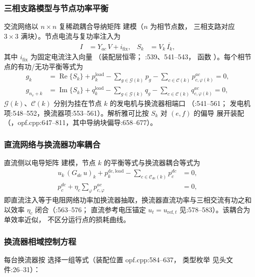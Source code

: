 \subsubsection*{三相支路模型与节点功率平衡}
交流网络以 $n\times n$ 复稀疏耦合导纳矩阵  建模（$n$ 为相节点数，
三相支路对应 $3\times 3$ 满块）。节点电流与复功率注入为
\begin{align*}
I &= Y_{ac}\,V + i_{\mathrm{fix}}, &
S_k &= V_k\,\overline{I_k},
\end{align*}
其中 $i_{\mathrm{fix}}$ 为固定电流注入向量 （装配层恒零；
:539、541--543，
函数 ）。每个相节点的有功/无功平衡等式为
\begin{align*}
g_k &= \operatorname{Re}\{S_k\} + p^{\mathrm{load}}_k
  - \sum_{g\in\mathcal{G}(k)} p_{g} - \sum_{c\in\mathcal{C}(k)} p^{ac}_{c,\varphi(k)} = 0,\\
g_{n_v+k} &= \operatorname{Im}\{S_k\} + q^{\mathrm{load}}_k
  - \sum_{g\in\mathcal{G}(k)} q_{g} - \sum_{c\in\mathcal{C}(k)} q^{ac}_{c,\varphi(k)} = 0,
\end{align*}
$\mathcal{G}(k)$、$\mathcal{C}(k)$ 分别为挂在节点 $k$ 的发电机与换流器相端口
（:541--561；
发电机项:548--552，换流器项:553--561）。解析雅可比按 $S_k$ 对 $(e,f)$ 的偏导
展开装配（，opf.cpp:647--811，其中导纳块偏导:658--677）。

\subsubsection*{直流网络与换流器功率耦合}
直流侧以电导矩阵  建模，节点 $k$ 的平衡等式与换流器耦合等式为
\begin{align*}
u_k\,(G_{dc}\,u)_k + p^{\mathrm{dc,load}}_k - \sum_{c\in\mathcal{C}_{dc}(k)} p^{dc}_c &= 0,\\
p^{dc}_c + \eta_c \sum_{\varphi} p^{ac}_{c,\varphi} &= 0,
\end{align*}
即直流注入等于电阻网络功率加换流器抽取，换流器直流功率与三相交流有功之和
以效率 $\eta_c$ 闭合（:563--576；
直流参考电压锚定 $u_t=u_{\mathrm{ref},t}$ 见:578--583）。该耦合为单效率近似，
不区分运行点的损耗曲线。

\subsubsection*{换流器相域控制方程}
每台换流器按  选择一组等式（装配位置 opf.cpp:584--637，
类型枚举  见头文件:26--31）：

